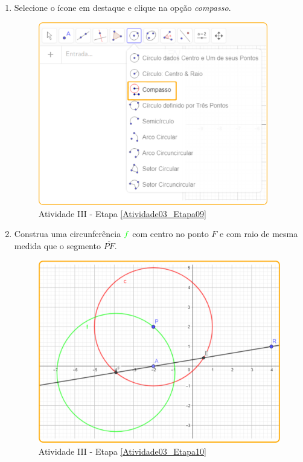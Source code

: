 \documentclass[11pt,a4paper]{article}
\begin{document}
\begin{enumerate}[{Etapa} 1.]
\item Selecione o ícone em destaque e clique na opção {\it compasso}. \label{Atividade03_Etapa09}
\begin{figure}[H]
    \centering
    \includegraphics[height=8cm]{Figuras/T01_Elemento04.png}
    \caption{Atividade III - Etapa \ref{Atividade03_Etapa09}}
    \label{Atividade03_Etapa09_Imagem}
\end{figure}

\item Construa uma circunferência ${\color{green}{f}}$ com centro no ponto $F$ e com raio de mesma medida que o segmento $\overline{PF}$. \label{Atividade03_Etapa10}
\begin{figure}[H]
    \centering
    \includegraphics[height=8cm]{Figuras/T01_Atividade03_Fig02.png}
    \caption{Atividade III - Etapa \ref{Atividade03_Etapa10}}
    \label{Atividade03_Etapa10_Imagem}
\end{figure}


\end{enumerate}
\end{document}
